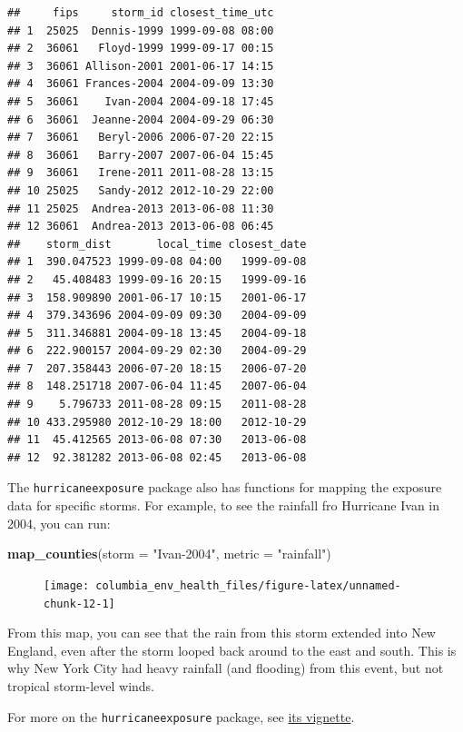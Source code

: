 \documentclass[]{tufte-book}
\newenvironment{Shaded}{}{}
\newcommand{\DataTypeTok}[1]{\textcolor[rgb]{0.56,0.13,0.00}{#1}}
\newcommand{\KeywordTok}[1]{\textcolor[rgb]{0.00,0.44,0.13}{\textbf{#1}}}
\newcommand{\NormalTok}[1]{#1}
\newcommand{\StringTok}[1]{\textcolor[rgb]{0.25,0.44,0.63}{#1}}
\begin{document}
\begin{verbatim}
##     fips     storm_id closest_time_utc
## 1  25025  Dennis-1999 1999-09-08 08:00
## 2  36061   Floyd-1999 1999-09-17 00:15
## 3  36061 Allison-2001 2001-06-17 14:15
## 4  36061 Frances-2004 2004-09-09 13:30
## 5  36061    Ivan-2004 2004-09-18 17:45
## 6  36061  Jeanne-2004 2004-09-29 06:30
## 7  36061   Beryl-2006 2006-07-20 22:15
## 8  36061   Barry-2007 2007-06-04 15:45
## 9  36061   Irene-2011 2011-08-28 13:15
## 10 25025   Sandy-2012 2012-10-29 22:00
## 11 25025  Andrea-2013 2013-06-08 11:30
## 12 36061  Andrea-2013 2013-06-08 06:45
##    storm_dist       local_time closest_date
## 1  390.047523 1999-09-08 04:00   1999-09-08
## 2   45.408483 1999-09-16 20:15   1999-09-16
## 3  158.909890 2001-06-17 10:15   2001-06-17
## 4  379.343696 2004-09-09 09:30   2004-09-09
## 5  311.346881 2004-09-18 13:45   2004-09-18
## 6  222.900157 2004-09-29 02:30   2004-09-29
## 7  207.358443 2006-07-20 18:15   2006-07-20
## 8  148.251718 2007-06-04 11:45   2007-06-04
## 9    5.796733 2011-08-28 09:15   2011-08-28
## 10 433.295980 2012-10-29 18:00   2012-10-29
## 11  45.412565 2013-06-08 07:30   2013-06-08
## 12  92.381282 2013-06-08 02:45   2013-06-08
\end{verbatim}

The \texttt{hurricaneexposure} package also has functions for mapping the exposure
data for specific storms. For example, to see the rainfall fro Hurricane Ivan in
2004, you can run:

\begin{Shaded}
\begin{Highlighting}[]
\KeywordTok{map_counties}\NormalTok{(}\DataTypeTok{storm =} \StringTok{"Ivan-2004"}\NormalTok{, }\DataTypeTok{metric =} \StringTok{"rainfall"}\NormalTok{)}
\end{Highlighting}
\end{Shaded}

\begin{figure}
\texttt{[image: columbia\_env\_health\_files/figure-latex/unnamed-chunk-12-1]} \end{figure}

From this map, you can see that the rain from this storm extended into New
England, even after the storm looped back around to the east and south. This is
why New York City had heavy rainfall (and flooding) from this event, but not
tropical storm-level winds.

For more on the \texttt{hurricaneexposure} package, see \href{https://cran.r-project.org/web/packages/hurricaneexposure/vignettes/hurricaneexposure.html}{its vignette}.
\end{document}
